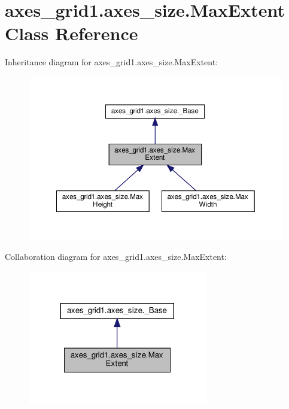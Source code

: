 \hypertarget{classaxes__grid1_1_1axes__size_1_1MaxExtent}{}\section{axes\+\_\+grid1.\+axes\+\_\+size.\+Max\+Extent Class Reference}
\label{classaxes__grid1_1_1axes__size_1_1MaxExtent}


Inheritance diagram for axes\+\_\+grid1.\+axes\+\_\+size.\+Max\+Extent\+:
\nopagebreak
\begin{figure}[H]
\begin{center}
\leavevmode
\includegraphics[width=350pt]{classaxes__grid1_1_1axes__size_1_1MaxExtent__inherit__graph}
\end{center}
\end{figure}


Collaboration diagram for axes\+\_\+grid1.\+axes\+\_\+size.\+Max\+Extent\+:
\nopagebreak
\begin{figure}[H]
\begin{center}
\leavevmode
\includegraphics[width=222pt]{classaxes__grid1_1_1axes__size_1_1MaxExtent__coll__graph}
\end{center}
\end{figure}
